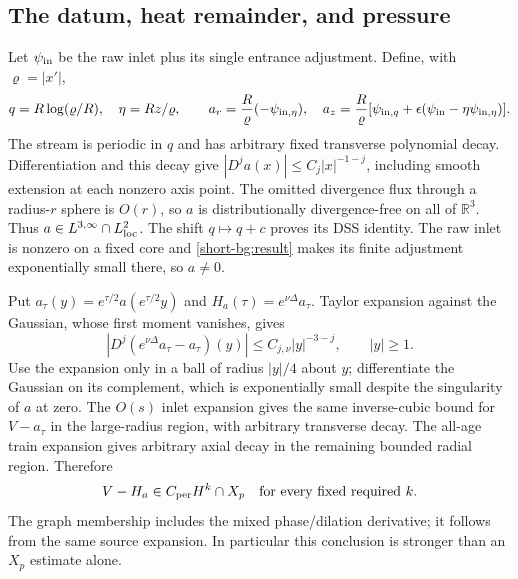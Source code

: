 \subsection{The datum, heat remainder, and pressure}

Let $\psi_{\rm in}$ be the raw inlet plus its single entrance
adjustment. Define, with $\varrho=|x'|$,
\[
 q=R\log(\varrho/R),\quad\eta=Rz/\varrho,\qquad
 a_r={R\over\varrho}(-\psi_{{\rm in},\eta}),\quad
 a_z={R\over\varrho}
 [\psi_{{\rm in},q}+\epsilon(\psi_{\rm in}
                          -\eta\psi_{{\rm in},\eta})].
\]
The stream is periodic in $q$ and has arbitrary fixed transverse
polynomial decay. Differentiation and this decay give
$|D^ja(x)|\le C_j|x|^{-1-j}$, including smooth extension at each
nonzero axis point. The omitted divergence flux through a radius-$r$
sphere is $O(r)$, so $a$ is distributionally divergence-free on all of
$\mathbb R^3$. Thus $a\in L^{3,\infty}\cap L^2_{\rm loc}$.
The shift $q\mapsto q+c$ proves its DSS identity. The raw inlet is
nonzero on a fixed core and \eqref{short-bg:result} makes its finite
adjustment exponentially small there, so $a\ne0$.

Put $a_\tau(y)=e^{\tau/2}a(e^{\tau/2}y)$ and
$H_a(\tau)=e^{\nu\Delta}a_\tau$. Taylor expansion against the Gaussian,
whose first moment vanishes, gives
\[
 |D^j(e^{\nu\Delta}a_\tau-a_\tau)(y)|
       \le C_{j,\nu}|y|^{-3-j},\qquad |y|\ge1.
\]
Use the expansion only in a ball of radius $|y|/4$ about $y$;
differentiate the Gaussian on its complement, which is exponentially
small despite the singularity of $a$ at zero. The $O(s)$ inlet
expansion gives the same inverse-cubic bound for $V-a_\tau$ in the
large-radius region, with arbitrary transverse decay. The all-age
train expansion gives arbitrary axial decay in the remaining bounded
radial region. Therefore
\begin{equation}
 V-H_a\in C_{\rm per}H^k\cap X_p
 \quad\hbox{for every fixed required }k.
 \label{short-bg:raw-heat}
\end{equation}
The graph membership includes the mixed phase/dilation derivative;
it follows from the same source expansion. In particular this
conclusion is stronger than an $X_p$ estimate alone.

